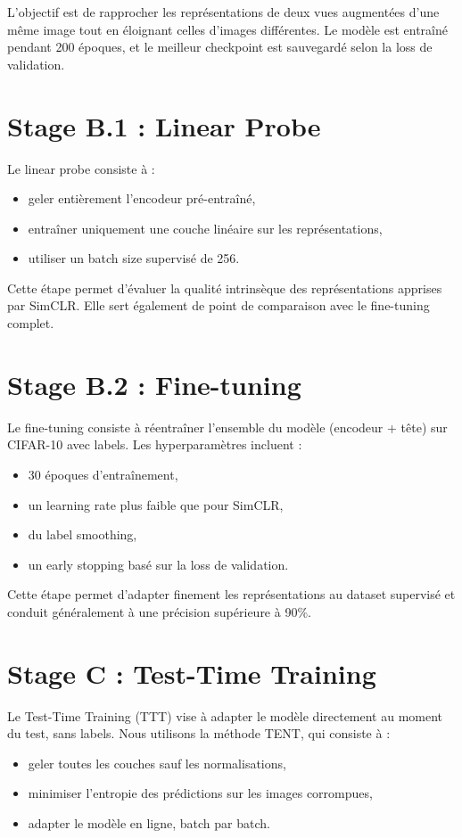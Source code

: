 \documentclass[12pt,a4paper]{report}
\begin{document}
	L’objectif est de rapprocher les représentations de deux vues augmentées d’une même image tout en éloignant celles d’images différentes. Le modèle est entraîné pendant 200 époques, et le meilleur checkpoint est sauvegardé selon la loss de validation.
	
	\section{Stage B.1 : Linear Probe}
	
	Le linear probe consiste à :
	\begin{itemize}
		\item geler entièrement l’encodeur pré-entraîné,
		\item entraîner uniquement une couche linéaire sur les représentations,
		\item utiliser un batch size supervisé de 256.
	\end{itemize}
	
	Cette étape permet d’évaluer la qualité intrinsèque des représentations apprises par SimCLR. Elle sert également de point de comparaison avec le fine-tuning complet.
	
	\section{Stage B.2 : Fine-tuning}
	
	Le fine-tuning consiste à réentraîner l’ensemble du modèle (encodeur + tête) sur CIFAR-10 avec labels. Les hyperparamètres incluent :
	\begin{itemize}
		\item 30 époques d’entraînement,
		\item un learning rate plus faible que pour SimCLR,
		\item du label smoothing,
		\item un early stopping basé sur la loss de validation.
	\end{itemize}
	
	Cette étape permet d’adapter finement les représentations au dataset supervisé et conduit généralement à une précision supérieure à 90\%.
	
	\section{Stage C : Test-Time Training}
	
	Le Test-Time Training (TTT) vise à adapter le modèle directement au moment du test, sans labels. Nous utilisons la méthode TENT, qui consiste à :
	\begin{itemize}
		\item geler toutes les couches sauf les normalisations,
		\item minimiser l’entropie des prédictions sur les images corrompues,
		\item adapter le modèle en ligne, batch par batch.
	\end{itemize}
	
\end{document}
